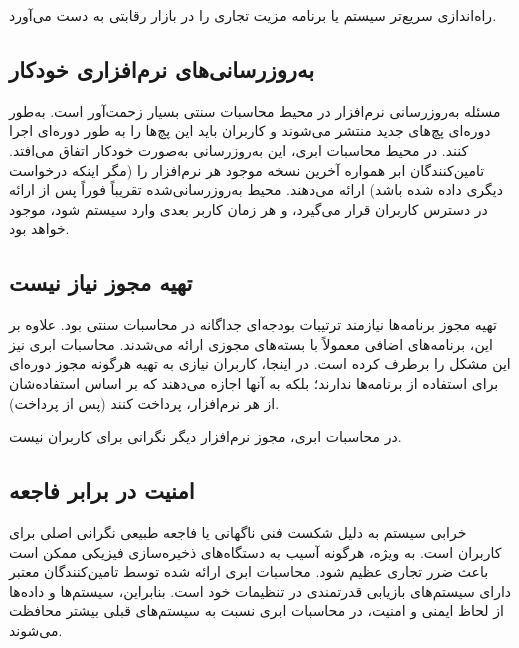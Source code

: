 \documentclass{book}
\begin{document}
    \begin{addinfo}

        راه‌اندازی سریع‌تر سیستم یا برنامه مزیت تجاری را در بازار رقابتی به دست می‌آورد.

    \end{addinfo}

    \subsection{به‌روزرسانی‌های نرم‌افزاری خودکار}

        مسئله به‌روزرسانی نرم‌افزار در محیط محاسبات سنتی بسیار زحمت‌آور است. به‌طور دوره‌ای پچ‌های جدید منتشر می‌شوند و کاربران باید این پچ‌ها را به طور دوره‌ای اجرا کنند. در محیط محاسبات ابری، این به‌روزرسانی به‌صورت خودکار اتفاق می‌افتد. تامین‌کنندگان ابر همواره آخرین نسخه موجود هر نرم‌افزار را (مگر اینکه درخواست دیگری داده شده باشد) ارائه می‌دهند. محیط به‌روزرسانی‌شده تقریباً فوراً پس از ارائه در دسترس کاربران قرار می‌گیرد، و هر زمان کاربر بعدی وارد سیستم شود، موجود خواهد بود.

    \subsection{تهیه مجوز نیاز نیست}

        تهیه مجوز برنامه‌ها نیازمند ترتیبات بودجه‌ای جداگانه در محاسبات سنتی بود. علاوه بر این، برنامه‌های اضافی معمولاً با بسته‌های مجوزی ارائه می‌شدند. محاسبات ابری نیز این مشکل را برطرف کرده است. در اینجا، کاربران نیازی به تهیه هرگونه مجوز دوره‌ای برای استفاده از برنامه‌ها ندارند؛ بلکه به آنها اجازه می‌دهند که بر اساس استفاده‌شان از هر نرم‌افزار، پرداخت کنند (پس از پرداخت).
    
    \begin{addinfo}

        در محاسبات ابری، مجوز نرم‌افزار دیگر نگرانی برای کاربران نیست.

    \end{addinfo}

    \subsection{امنیت در برابر فاجعه}

        خرابی سیستم به دلیل شکست فنی ناگهانی یا فاجعه طبیعی نگرانی اصلی برای کاربران است. به ویژه، هرگونه آسیب به دستگاه‌های ذخیره‌سازی فیزیکی ممکن است باعث ضرر تجاری عظیم شود. محاسبات ابری ارائه شده توسط تامین‌کنندگان معتبر دارای سیستم‌های بازیابی قدرتمندی در تنظیمات خود است. بنابراین، سیستم‌ها و داده‌ها از لحاظ ایمنی و امنیت، در محاسبات ابری نسبت به سیستم‌های قبلی بیشتر محافظت می‌شوند.
\end{document}
